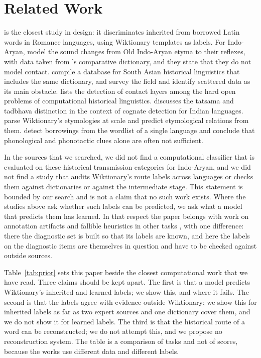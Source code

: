 \documentclass[11pt]{article}
\begin{document}
\section{Related Work}

\citet{cristea2021inherited} is the closest study in design: it discriminates inherited from borrowed Latin words in Romance languages, using Wiktionary templates as labels. For Indo-Aryan, \citet{cathcart2020disentangling} model the sound changes from Old Indo-Aryan etyma to their reflexes, with data taken from \citeauthor{turner1966cdial}'s comparative dictionary, and they state that they do not model contact. \citet{arora2023jambu} compile a database for South Asian historical linguistics that includes the same dictionary, and \citet{arora2022computational} survey the field and identify scattered data as its main obstacle. \citet{list2024openproblems} lists the detection of contact layers among the hard open problems of computational historical linguistics. \citet[\S4.1]{kanojia2021thesis} discusses the tatsama and tadbhava distinction in the context of cognate detection for Indian languages. \citet{wu2020computational} parse Wiktionary's etymologies at scale and predict etymological relations from them. \citet{miller2020lexical} detect borrowings from the wordlist of a single language and conclude that phonological and phonotactic clues alone are often not sufficient.

In the sources that we searched, we did not find a computational classifier that is evaluated on these historical transmission categories for Indo-Aryan, and we did not find a study that audits Wiktionary's route labels across languages or checks them against dictionaries or against the intermediate stage. This statement is bounded by our search and is not a claim that no such work exists. Where the studies above ask whether such labels can be predicted, we ask what a model that predicts them has learned. In that respect the paper belongs with work on annotation artifacts and fallible heuristics in other tasks \citep{gururangan2018annotation,mccoy2019right}, with one difference: there the diagnostic set is built so that its labels are known, and here the labels on the diagnostic items are themselves in question and have to be checked against outside sources.

Table~\ref{tab:prior} sets this paper beside the closest computational work that we have read. Three claims should be kept apart. The first is that a model predicts Wiktionary's inherited and learned labels; we show this, and where it fails. The second is that the labels agree with evidence outside Wiktionary; we show this for inherited labels as far as two expert sources and one dictionary cover them, and we do not show it for learned labels. The third is that the historical route of a word can be reconstructed; we do not attempt this, and we propose no reconstruction system. The table is a comparison of tasks and not of scores, because the works use different data and different labels.
\end{document}
